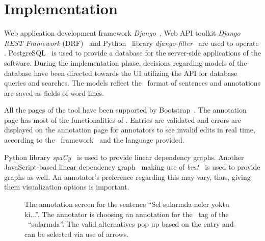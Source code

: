 \section{Implementation}
\label{sec:implementation}

Web application development framework \textit{Django}~\cite{django}, Web API toolkit \textit{Django REST Framework} (DRF)~\cite{drf} and Python~\cite{python} library \textit{django-filter}~\cite{django-filter} are used to operate \boatvtwo.
PostgreSQL~\cite{psql} is used to provide a database for the server-side applications of the software.
During the implementation phase, decisions regarding models of the database have been directed towards the UI utilizing the API for database queries and searches.
The models reflect the \ud\ format of sentences and annotations are saved as fields of word lines.

All the pages of the tool have been supported by Bootstrap~\cite{bootstrap}.
The annotation page has most of the functionalities of \boatvone.
Entries are validated and errors are displayed on the annotation page for annotators to see invalid edits in real time, according to the \ud\ framework~\cite{UD-git} and the language provided.

Python library \textit{spa\textsc{C}y}~\cite{spacy} is used to provide linear dependency graphs.
Another JavaScript-based linear dependency graph~\cite{spyssalo} making use of \textit{brat}~\cite{brat-vis} is used to provide graphs as well.
An annotator's preference regarding this may vary, thus, giving them visualization options is important.

\begin{figure}[tbh]
    \centering
    \caption{The annotation screen for the sentence ``Sel sularında neler yoktu ki...''.
        The annotator is choosing an annotation for the \deprel\ tag of the \form\ ``sularında''.
        The valid alternatives pop up based on the entry and can be selected via use of arrows. }
    \label{fig:anno-fig}
\end{figure}

